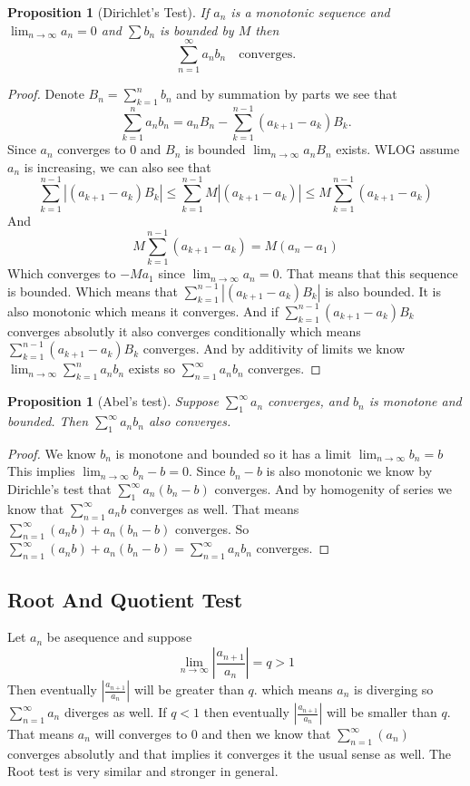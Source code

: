 \documentclass[11pt,a4paper]{article}
\theoremstyle{definition}
\theoremstyle{plain}
\newtheorem{proposition}[theorem]{Proposition}
\newcommand{\abs}[1]{\left\lvert #1\right\rvert}
\begin{document}
  \begin{proposition}[Dirichlet's Test]
    If $a_n$ is a monotonic sequence and $\lim_{n\to\infty} a_n = 0$ and 
    $\sum b_n$ is bounded by $M$ then
    \[
      \sum_{n=1}^{\infty} a_n b_n \quad\mathrm{ converges}.
    \]
  \end{proposition}
  \begin{proof}
		Denote $B_{n} = \sum_{k=1}^{n}{b_{n}}$ and by summation by parts we see that
		\[
			\sum_{k=1}^{n}{a_{n}b_{n}} =
      a_{n}B_{n} - \sum_{k=1}^{n-1}{(a_{k+1}-a_{k})B_k}.
		\]
		Since $a_{n}$ converges to $0$ and $B_{n}$ is bounded 
		$\lim_{n\to\infty}{a_nB_n}$ exists.
		WLOG assume $a_n$ is increasing, we can also see that
		\[
    \sum_{k=1}^{n-1} \abs{(a_{k+1}-a_{k})B_k} \le
    \sum_{k=1}^{n-1} M\abs{(a_{k+1}-a_{k})} \le
			M \sum_{k=1}^{n-1}{(a_{k+1}-a_{k})}
		\] 
		And
		\[
			M \sum_{k=1}^{n-1}{(a_{k+1}-a_{k})} = M(a_{n}-a_{1})
		\]
		Which converges to $-Ma_1$ since $\lim_{n\to\infty}{a_n}=0$.
		That means that this sequence is bounded. Which means that
		$\sum_{k=1}^{n-1}{|(a_{k+1}-a_{k})B_k|}$ is also bounded.
		It is also monotonic which means it converges. And if
		$\sum_{k=1}^{n-1}{(a_{k+1}-a_{k})B_k}$ converges absolutly it also
		converges conditionally which means $\sum_{k=1}^{n-1}{(a_{k+1}-a_{k})B_k}$
		converges. And by additivity of limits we know 
		$\lim_{n\to\infty}\sum_{k=1}^{n}{a_{n}b_{n}}$ exists so 
		$\sum_{n=1}^\infty a_nb_n$ converges.
  \end{proof}
	
  \begin{proposition}[Abel's test]
	Suppose $\sum_{1}^{\infty}{a_n}$ converges, and $b_n$ is monotone and bounded.
    Then $\sum_{1}^{\infty}{a_nb_n}$ also converges.
  \end{proposition}
	\begin{proof}
		We know $b_n$ is monotone and bounded so it has a limit $\lim_{n\to\infty}{b_n}=b$
		This implies $\lim_{n\to\infty}{b_n-b}=0$. 
		Since $b_n-b$ is also monotonic we know by Dirichle's test that 
		$\sum_{1}^{\infty}{a_n(b_n-b)}$ converges. And by homogenity of series we know that
		 $\sum_{n=1}^{\infty}{a_n b}$ converges as well.
		That means $\sum_{n=1}^{\infty}{(a_n b)+a_n(b_n-b)}$ converges.
		So $\sum_{n=1}^{\infty}{(a_n b)+a_n(b_n-b)} = \sum_{n=1}^{\infty}{a_nb_n}$
    converges.
	\end{proof}

	\subsection{Root And Quotient Test}
	Let $a_n$ be asequence and suppose
	\[
		\lim_{n\to\infty} \left| \frac{a_{n+1}}{a_n} \right| = q > 1
	\]
	Then eventually $\left|\frac{a_{n+1}}{a_n}\right|$ will be greater than $q$. 
	which means $a_n$ is diverging so $\sum_{n=1}^{\infty}{a_n}$ 
	diverges as well. 
	If $q<1$ then eventually $\left|\frac{a_{n+1}}{a_n}\right|$ will be smaller than $q$. 
	That means $a_n$ will converges to $0$ and then we know that 
	$\sum_{n=1}^{\infty}(a_n)$ converges absolutly 
	and that implies it converges it the usual sense as well. 
	The Root test is very similar and stronger in general.
	
\end{document}
